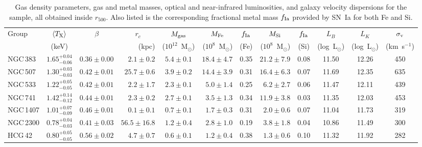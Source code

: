 \documentclass[useAMS,usenatbib]{mn2e}
\begin{document}
\begin{table} 
 \centering 
   \caption{Gas density parameters, gas and metal masses, optical and
     near-infrared luminosities, and galaxy velocity dispersions for
     the sample, all obtained inside $r_{500}$. Also listed is the
     corresponding fractional metal mass $f_{\rm Ia}$ provided by
     SN~Ia for both Fe and Si.}
  \label{tab,gas} 
  \begin{tabular}{@{}lccrcrcrcccc@{}} \hline 
   \multicolumn{1}{l}{Group} & 
\multicolumn{1}{c}{$\langle T_{\rm X} \rangle$} & 
\multicolumn{1}{c}{$\beta$} & 
\multicolumn{1}{c}{$r_c$} &
\multicolumn{1}{c}{$M_{\rm gas}$} &
\multicolumn{1}{c}{$M_{\rm Fe}$} &
\multicolumn{1}{c}{$f_{\rm Ia}$} &
\multicolumn{1}{c}{$M_{\rm Si}$} &
\multicolumn{1}{c}{$f_{\rm Ia}$} &
\multicolumn{1}{c}{$L_B$} &
\multicolumn{1}{c}{$L_K$} &
\multicolumn{1}{c}{$\sigma_{\rm v}$} \\
  &  (keV) &   & (kpc) \hspace{3mm} & ($10^{12}$~M$_\odot$) & 
  ($10^8$~M$_\odot$) & (Fe) & ($10^8$~M$_\odot$) & (Si) 
  & (log~L$_\odot$) & (log~L$_\odot$) &  (km~s$^{-1}$)  \\ \hline 
NGC\,383  & $1.65^{+0.04}_{-0.06}$ & $0.36\pm 0.00$ & $2.1\pm 0.2$  & 
    $5.4 \pm 0.1$ & $18.4\pm 4.7$ & 0.35 & $21.2\pm 7.9$ & 0.08 & 11.50 & 
    12.26 & 450 \\  
NGC\,507  & $1.30^{+0.03}_{-0.03}$ & $0.42\pm 0.01$ & $25.7\pm 0.6$ & 
    $3.9 \pm 0.2$ & $14.4\pm 3.9$ & 0.31 & $16.4\pm 6.3$ & 0.07 & 11.69 & 
    12.35 & 635 \\   
NGC\,533  & $1.22^{+0.05}_{-0.05}$ & $0.42\pm 0.01$ & $2.2\pm 1.7$  & 
    $2.3 \pm 0.1$ & $5.0\pm 1.4$ & 0.25 & $6.2\pm 2.7$   & 0.06 & 11.47 & 
    12.11 & 439 \\ 
NGC\,741  & $1.42^{+0.14}_{-0.12}$ & $0.44\pm 0.01$ & $2.3\pm 0.2$ & 
    $2.7 \pm 0.1$ & $3.5\pm 1.3$ & 0.34 & $11.9\pm 3.8$  & 0.03 & 11.35 & 
    12.03 & 453 \\ 
NGC\,1407 & $1.01^{+0.07}_{-0.09}$ & $0.46\pm 0.01$ & $0.1\pm 0.1$ & 
    $0.7 \pm 0.1$ & $1.7\pm 0.3$ & 0.31 & $2.0\pm 0.6$   & 0.07 & 11.04 & 
    11.73 &   319 \\ 
NGC\,2300 & $0.78^{+0.04}_{-0.03}$ & $0.41\pm 0.03$ & $56.5\pm 16.8$ & 
    $1.2 \pm 0.4$ & $2.8\pm 1.0$ & 0.19  & $3.8\pm 1.8$  & 0.04 & 10.86 & 
    11.49 &  300 \\ 
HCG\,42   & $0.80^{+0.05}_{-0.05}$ & $0.56\pm 0.02$ & $4.7\pm 0.7$ & 
    $0.6 \pm 0.1$ &  $1.2\pm 0.4$ & 0.38 & $1.3\pm 0.6$  & 0.10 & 11.32 & 
    11.92 &   282 \\ 

\end{tabular}
\end{table}
\end{document}
